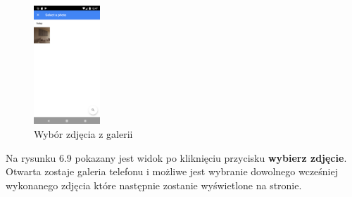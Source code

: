 \begin{figure}[!htb]
	\begin{center}
		\includegraphics[width=2.5cm]{rys/ZZf3.png}
		\caption{Wybór zdjęcia z galerii}
		\label{rys:rysunek049}
	\end{center}
\end{figure}

Na rysunku 6.9 pokazany jest widok po kliknięciu przycisku \textbf{wybierz zdjęcie}. Otwarta zostaje galeria telefonu i możliwe jest wybranie dowolnego wcześniej wykonanego zdjęcia które następnie zostanie wyświetlone na stronie. 